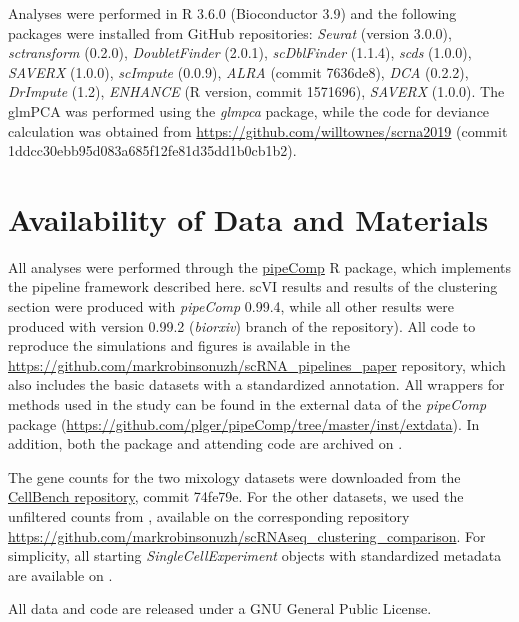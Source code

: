 \documentclass{bmcart}
\begin{document}
Analyses were performed in R 3.6.0 (Bioconductor 3.9) and the following packages were installed from GitHub repositories: \textit{Seurat} (version 3.0.0), \textit{sctransform} (0.2.0), \textit{DoubletFinder} (2.0.1), \textit{scDblFinder} (1.1.4), \textit{scds} (1.0.0), \textit{SAVERX} (1.0.0), \textit{scImpute} (0.0.9), \textit{ALRA} (commit 7636de8), \textit{DCA} (0.2.2), \textit{DrImpute} (1.2), \textit{ENHANCE} (R version, commit 1571696), \textit{SAVERX} (1.0.0). The glmPCA was performed using the \textit{glmpca} package, while the code for deviance calculation was obtained from \url{https://github.com/willtownes/scrna2019} (commit 1ddcc30ebb95d083a685f12fe81d35dd1b0cb1b2).

\section*{Availability of Data and Materials}

All analyses were performed through the \href{https://github.com/plger/pipeComp}{pipeComp} R package, which implements the pipeline framework described here. scVI results and results of the clustering section were produced with \textit{pipeComp} 0.99.4, while all other results were produced with version 0.99.2 (\textit{biorxiv}) branch of the repository). All code to reproduce the simulations and figures is available in the \url{https://github.com/markrobinsonuzh/scRNA\_pipelines\_paper} repository, which also includes the basic datasets with a standardized annotation. All wrappers for methods used in the study can be found in the external data of the \textit{pipeComp} package (\url{https://github.com/plger/pipeComp/tree/master/inst/extdata}). In addition, both the package and attending code are archived on \cite{figshare_code}.

The gene counts for the two mixology datasets were downloaded from the  \href{https://github.com/LuyiTian/CellBench_data/data/sincell_with_class.RData}{CellBench repository}, commit 74fe79e. For the other datasets, we used the unfiltered counts from \cite{duoClustering2018}, available on the corresponding repository \url{https://github.com/markrobinsonuzh/scRNAseq\_clustering\_comparison}. For simplicity, all starting \textit{SingleCellExperiment} objects with standardized metadata are available on \cite{figshare_sce}.

All data and code are released under a GNU General Public License.

\end{document}
